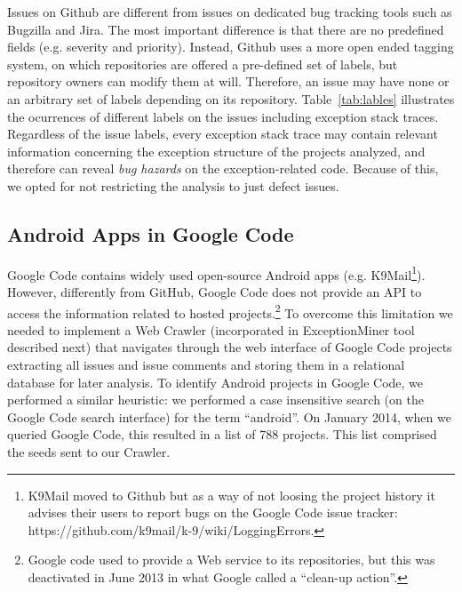 Issues on Github are different from issues on dedicated bug tracking tools such as 
Bugzilla and Jira. The most important difference is that there are no predefined fields
  (e.g. severity and priority). Instead, Github uses a more open ended tagging system, on which
repositories are offered a pre-defined set of labels, but repository owners can modify 
them at will. Therefore, an issue may have none or an arbitrary set of labels depending 
on its repository. Table~\ref{tab:lables} illustrates the ocurrences of different labels 
on the issues including exception stack traces. Regardless of the issue labels, every exception stack
trace may contain relevant information concerning the exception structure of the
projects analyzed, and therefore can reveal \emph{bug hazards} on the exception-related code.
Because of this, we opted for not restricting the analysis to just defect issues.


\subsection{Android Apps in Google Code}
Google Code contains widely used open-source Android apps (e.g. K9Mail\footnote{K9Mail moved to Github but as a way of not loosing the project history it advises their users to report bugs on the Google Code issue tracker: https://github.com/k9mail/k-9/wiki/LoggingErrors.}).
However, differently from GitHub, Google Code does not provide an API to access the information related
 to hosted projects.\footnote{Google code used to provide a Web service to its repositories, but this was deactivated in June 2013 in what Google called a ``clean-up action''.}
To overcome this limitation we needed to implement a Web Crawler (incorporated in ExceptionMiner tool described next) that navigates 
through the web interface of Google Code projects extracting all issues and issue comments and storing them in a relational database for later analysis.
To identify Android projects in Google Code, we performed a similar heuristic: we performed a case insensitive search 
(on the Google Code search interface) for the term ``android''. On January 2014, when we queried Google Code, this resulted in a list of 788  projects. This list comprised the seeds sent to our Crawler.

